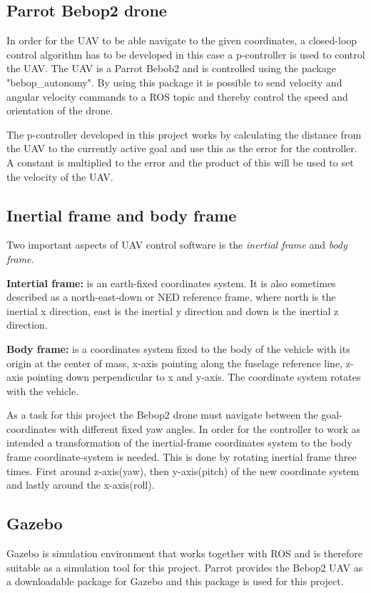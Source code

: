 \documentclass[conference]{IEEEtran}
\begin{document}
\subsection{Parrot Bebop2 drone}
In order for the UAV to be able navigate to the given coordinates, a closed-loop control algorithm has to be developed in this case a p-controller is used to control the UAV. The UAV is a Parrot Bebob2 and is controlled using the package "bebop\_autonomy". By using this package it is possible to send velocity and angular velocity commands to a ROS topic and thereby control the speed and orientation of the drone. 

The p-controller developed in this project works by calculating the distance from the UAV to the currently active goal and use this as the error for the controller. A constant is multiplied to the error and the product of this will be used to set the velocity of the UAV.

\subsection{Inertial frame and body frame}
Two important aspects of UAV control software is the \textit{inertial frame} and \textit{body frame}.

\textbf{Intertial frame:} is an earth-fixed coordinates system. It is also sometimes described as a  north-east-down or NED reference frame, where north is the inertial x direction, east is the inertial y direction and down is the inertial z direction\cite{book}. 

\textbf{Body frame: } is a coordinates system fixed to the body of the vehicle with its origin at the center of mass, x-axis pointing along the fuselage reference line, z-axis pointing down perpendicular to x and y-axis. The coordinate system rotates with the vehicle. 

As a task for this project the Bebop2 drone must navigate between the goal-coordinates with different fixed yaw angles. In order for the controller to work as intended a transformation of the inertial-frame coordinates system to the body frame coordinate-system is needed. This is done by rotating inertial frame three times. First around z-axis(yaw), then y-axis(pitch) of the new coordinate system and lastly around the x-axis(roll).  

\subsection{Gazebo}
Gazebo is simulation environment that works together with ROS and is therefore suitable as a simulation tool for this project. Parrot provides the Bebop2 UAV as a downloadable package for Gazebo and this package is used for this project.
\end{document}
